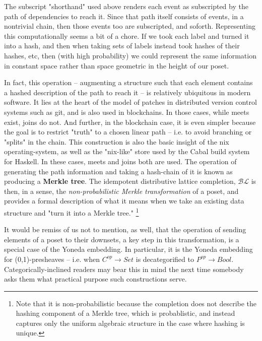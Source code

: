 \documentclass[hoptionsi,review,format=acmsmall]{acmart}
\theoremstyle{definition}
\newcommand{\BLc}{\mathcal{BL}}
\begin{document}
The subscript "shorthand" used above renders each event as subscripted by the path of dependencies to reach it. Since that path itself consists of events, in a nontrivial chain, then those events too are subscripted, and soforth. Representing this computationally seems a bit of a chore. If we took each label and turned it into a hash, and then when taking sets of labels instead took hashes of their hashes, etc, then (with high probability) we could represent the same information in constant space rather than space geometric in the height of our poset.

In fact, this operation -- augmenting a structure such that each element contains a hashed description of the path to reach it -- is relatively ubiquitous in modern software. It lies at the heart of the model of patches in distributed version control systems such as git, and is also used in blockchains. In those cases, while meets exist, joins do not. And further, in the blockchain case, it is even simpler because the goal is to restrict "truth" to a chosen linear path -- i.e. to avoid branching or "splits" in the chain. This construction is also the basic insight of the nix operating-system, as well as the "nix-like" store used by the Cabal build system for Haskell. In these cases, meets and joins both are used. The operation of generating the path information and taking a hash-chain of it is known as producing a \textbf{Merkle tree}\cite{merkle1987digital}. The idempotent distributive lattice completion, \(\BLc\) is then, in a sense,  the \textit{non-probabilistic Merkle transformation} of a poset, and provides a formal description of what it means when we take an existing data structure and "turn it into a Merkle tree." \footnote{Note that it is non-probabilistic because the completion does not describe the hashing component of a Merkle tree, which is probablistic, and instead captures only the uniform algebraic structure in the case where hashing is unique.}

It would be remiss of us not to mention, as well, that the operation of sending elements of a poset to their downsets, a key step in this transformation, is a special case of the Yoneda embedding. In particular, it is the Yoneda embedding for (0,1)-presheaves -- i.e. when \(C^{op} \rightarrow Set\) is decategorified to \(P^{op} \rightarrow Bool\). Categorically-inclined readers may bear this in mind the next time somebody asks them what practical purpose such constructions serve.

\end{document}
